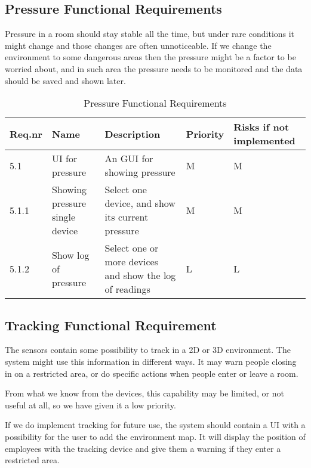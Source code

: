 \documentclass[../document]{subfiles}
\begin{document}
\subsection{Pressure Functional Requirements}
Pressure in a room should stay stable all the time, but under rare conditions it might change and those changes are often unnoticeable. If we change the environment to some dangerous areas then the pressure might be a factor to be worried about, and in such area the pressure needs to be monitored and the data should be saved and shown later.

\begin{table}[H]
\caption{Pressure Functional Requirements}
\centering
\begin{tabularx}{\textwidth}{|l|X|X|l|X|}
\hline
Req.nr
&Name
&Description
&Priority
&Risks if not implemented
\\ \hline 5.1
&UI for pressure
&An GUI for showing pressure
&M
&M
\\ \hline 5.1.1
&Showing pressure single device
&Select one device, and show its current pressure
&M
&M
\\ \hline 5.1.2
&Show log of pressure
&Select one or more devices and show the log of readings
&L
&L
\\ \hline 
\end{tabularx}
\end{table}

\subsection{Tracking Functional Requirement}
The sensors contain some possibility to track in a 2D or 3D environment. The system might use this information in different ways. It may warn people closing in on a restricted area, or do specific actions when people enter or leave a room.

From what we know from the devices, this capability may be limited, or not useful at all, so we have given it a low priority.

If we do implement tracking for future use, the system should contain a UI with a possibility for the user to add the environment map. It will display the position of employees with the tracking device and give them a warning if they enter a restricted area.
\end{document}
